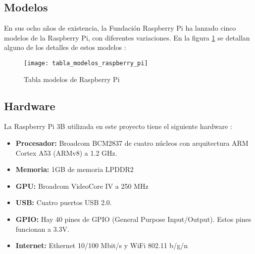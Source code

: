 
        \subsection{Modelos} %
        \label{sub:ModelosRaspberryPi}

            En sus ocho años de existencia, la Fundación Raspberry Pi ha lanzado cinco modelos de la Raspberry Pi, con
            diferentes variaciones. En la figura \ref{fig:ImagenModelosPi} se detallan alguno de los detalles de estos
            modelos \cite{raspberry_pi_wikipedia_en}:

            \begin{figure}[ht]
                \centering
                \texttt{[image: tabla\_modelos\_raspberry\_pi]}
                \caption{Tabla modelos de Raspberry Pi \cite{raspberry_pi_wikipedia_en}\label{fig:ImagenModelosPi}}
            \end{figure}


        \subsection{Hardware} %
        \label{sub:HardwareRaspberryPi}

            La Raspberry Pi 3B utilizada en este proyecto tiene el siguiente hardware \cite{raspberry_pi_hardware}:

            \begin{itemize}
                \item \textbf{Procesador:} Broadcom BCM2837 de cuatro núcleos con arquitectura ARM Cortex A53 (ARMv8) a
                1.2 GHz.
                \item \textbf{Memoria:} 1GB de memoria LPDDR2
                \item \textbf{GPU:} Broadcom VideoCore IV a 250 MHz
                \item \textbf{USB:} Cuatro puertos USB 2.0.
                \item \textbf{GPIO:} Hay 40 pines de GPIO (General Purpose Input/Output). Estos pines funcionan a 3.3V.
                \item \textbf{Internet:} Ethernet 10/100 Mbit/s y WiFi 802.11 b/g/n
            \end{itemize}


